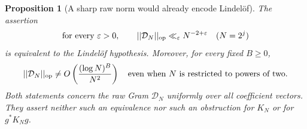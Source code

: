 \documentclass[11pt]{article}
\def\norm#1{||#1||}%
\newtheorem{proposition}[theorem]{Proposition}
\theoremstyle{remark}
\newcommand{\norm}[1]{\left\lVert #1\right\rVert}
\begin{document}
\begin{proposition}[A sharp raw norm would already encode Lindel\"of]
\label{prop:v158-lindelof-budget}
The assertion
\begin{equation}
 \text{for every }\varepsilon>0,\qquad
 \norm{\mathcal D_N}_{\rm op}\ll_\varepsilon N^{-2+\varepsilon}
 \quad(N=2^j)
 \label{eq:v158-near-scale-budget}
\end{equation}
is equivalent to the Lindel\"of hypothesis. Moreover, for every fixed
$B\geq0$,
\begin{equation}
 \norm{\mathcal D_N}_{\rm op}
 \ne O\left(\frac{(\log N)^B}{N^2}\right)
 \quad\text{even when }N\text{ is restricted to powers of two}.
 \label{eq:v158-no-log-budget}
\end{equation}
Both statements concern the raw Gram $\mathcal D_N$ uniformly over
\emph{all} coefficient vectors. They assert neither such an equivalence
nor such an obstruction for $K_N$ or for $g^*K_Ng$.
\end{proposition}
\end{document}
